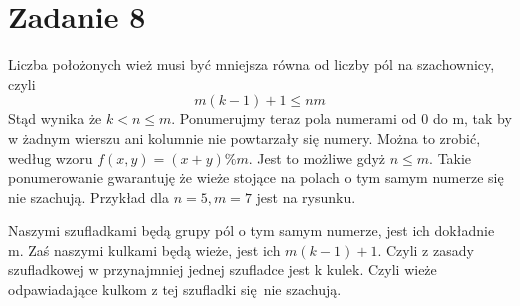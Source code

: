 \documentclass{article}
\begin{document}
\newpage
\section*{Zadanie 8}

Liczba położonych wież musi być mniejsza równa od liczby pól na szachownicy, czyli 
\[m(k-1) + 1 \leq n m\]
Stąd wynika że $k < n \leq m$. Ponumerujmy teraz pola numerami od 0 do m, tak by w żadnym wierszu ani kolumnie nie powtarzały się numery. Można to zrobić, według wzoru $f(x,y) = (x+y) \% m$. Jest to możliwe gdyż $n \leq m$. Takie ponumerowanie gwarantuję że wieże stojące na polach o tym samym numerze się nie szachują.
Przykład dla $n = 5, m = 7$ jest na rysunku.
\begin{center}
\end{center}
Naszymi szufladkami będą grupy pól o tym samym numerze, jest ich dokładnie m. Zaś naszymi kulkami będą wieże, jest ich $m(k-1) + 1$. Czyli z zasady szufladkowej w przynajmniej jednej szufladce jest k kulek. Czyli wieże odpawiadające kulkom z tej szufladki się nie szachują.
\end{document}
